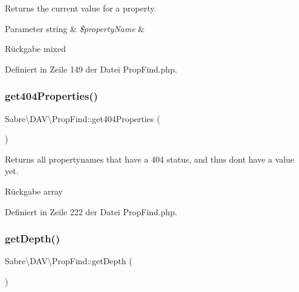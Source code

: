Returns the current value for a property.


\begin{DoxyParams}[1]{Parameter}
string & {\em \$property\+Name} & \\
\hline
\end{DoxyParams}
\begin{DoxyReturn}{Rückgabe}
mixed 
\end{DoxyReturn}


Definiert in Zeile 149 der Datei Prop\+Find.\+php.

\mbox{\label{class_sabre_1_1_d_a_v_1_1_prop_find_a61810aa4acb7b64c4a75447b018e83f7}} 
\subsubsection{\texorpdfstring{get404\+Properties()}{get404Properties()}}
{\footnotesize\ttfamily Sabre\textbackslash{}\+D\+A\+V\textbackslash{}\+Prop\+Find\+::get404\+Properties (\begin{DoxyParamCaption}{ }\end{DoxyParamCaption})}

Returns all propertynames that have a 404 status, and thus don\textquotesingle{}t have a value yet.

\begin{DoxyReturn}{Rückgabe}
array 
\end{DoxyReturn}


Definiert in Zeile 222 der Datei Prop\+Find.\+php.

\mbox{\label{class_sabre_1_1_d_a_v_1_1_prop_find_a2e46b579dac1d57f86a48d6bd8d51ce6}} 
\subsubsection{\texorpdfstring{get\+Depth()}{getDepth()}}
{\footnotesize\ttfamily Sabre\textbackslash{}\+D\+A\+V\textbackslash{}\+Prop\+Find\+::get\+Depth (\begin{DoxyParamCaption}{ }\end{DoxyParamCaption})}

